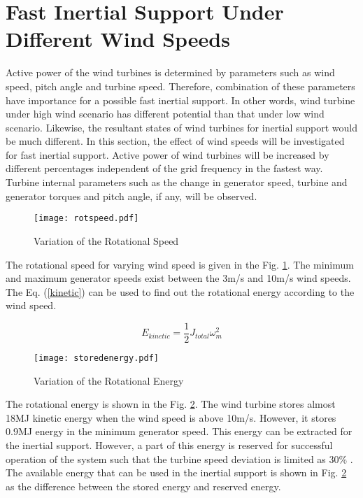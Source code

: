 \section{Fast Inertial Support Under Different Wind Speeds}
Active power of the wind turbines is determined by parameters such as wind speed, pitch angle and turbine speed. Therefore, combination of these parameters have importance for a possible fast inertial support. In other words, wind turbine under high wind scenario has different potential than that under low wind scenario. Likewise, the resultant states of wind turbines for inertial support would be much different. In this section, the effect of wind speeds will be investigated for fast inertial support. Active power of wind turbines will be increased by different percentages independent of the grid frequency in the fastest way. Turbine internal parameters such as the change in generator speed, turbine and generator torques and pitch angle, if any, will be observed. \par
\begin{figure}[h]
	\centering
	\texttt{[image: rotspeed.pdf]}
	\caption{Variation of the Rotational Speed}
	\label{rotspeed}
\end{figure}
The rotational speed for varying wind speed is given in the Fig. \ref{rotspeed}. The minimum and maximum generator speeds exist between the 3m/s and 10m/s wind speeds. The Eq. (\ref{kinetic}) can be used to find out the rotational energy according to the wind speed.\par
\begin{equation}
E_{kinetic}=\frac{1}{2}J_{total}\omega_{m}^{2}
\label{kinetic}
\end{equation}
\begin{figure}[h!]
	\centering
	\texttt{[image: storedenergy.pdf]}
	\caption{Variation of the Rotational Energy}
	\label{rotenergy}
\end{figure}
The rotational energy is shown in the Fig. \ref{rotenergy}. The wind turbine stores almost 18MJ kinetic energy when the wind speed is above 10m/s. However, it stores 0.9MJ energy in the minimum generator speed. This energy can be extracted for the inertial support. However, a part of this energy is reserved for successful operation of the system such that the turbine speed deviation is limited as 30\% \cite{Wu2014}. The available energy that can be used in the inertial support is shown in Fig. \ref{rotenergy} as the difference between the stored energy and reserved energy. \par
